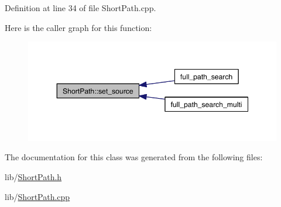 Definition at line 34 of file Short\-Path.\-cpp.



Here is the caller graph for this function\-:
\nopagebreak
\begin{figure}[H]
\begin{center}
\leavevmode
\includegraphics[width=348pt]{class_short_path_a76568de48f805ee8fdd8dac0f07b2188_icgraph}
\end{center}
\end{figure}




The documentation for this class was generated from the following files\-:\begin{DoxyCompactItemize}
\item 
lib/\hyperlink{_short_path_8h}{Short\-Path.\-h}\item 
lib/\hyperlink{_short_path_8cpp}{Short\-Path.\-cpp}\end{DoxyCompactItemize}
